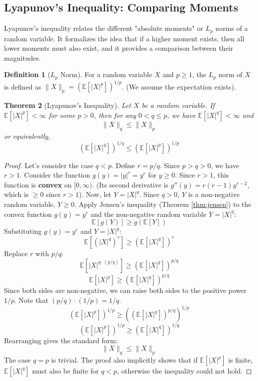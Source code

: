\documentclass[11pt, letterpaper]{article}
\theoremstyle{plain} %
\newtheorem{theorem}{Theorem}[section]
\theoremstyle{definition} %
\newtheorem{definition}[theorem]{Definition}
\theoremstyle{remark} %
\newcommand{\E}{\mathbb{E}} %
\begin{document}
\subsection{Lyapunov's Inequality: Comparing Moments}

Lyapunov's inequality relates the different "absolute moments" or $L_p$ norms of a random variable. It formalizes the idea that if a higher moment exists, then all lower moments must also exist, and it provides a comparison between their magnitudes.

\begin{definition}[$L_p$ Norm]
For a random variable $X$ and $p \ge 1$, the $L_p$ norm of $X$ is defined as $\|X\|_p = \left( \E[|X|^p] \right)^{1/p}$. (We assume the expectation exists).
\end{definition}

\begin{theorem}[Lyapunov's Inequality] \label{thm:lyapunov}
Let $X$ be a random variable. If $\E[|X|^p] < \infty$ for some $p > 0$, then for any $0 < q \le p$, we have $\E[|X|^q] < \infty$ and
\[
\|X\|_q \le \|X\|_p
\]
or equivalently,
\[
\left( \E[|X|^q] \right)^{1/q} \le \left( \E[|X|^p] \right)^{1/p}
\]
\end{theorem}

\begin{proof}
Let's consider the case $q < p$. Define $r = p/q$. Since $p > q > 0$, we have $r > 1$.
Consider the function $g(y) = |y|^r = y^r$ for $y \ge 0$. Since $r > 1$, this function is \textbf{convex} on $[0, \infty)$. (Its second derivative is $g''(y) = r(r-1)y^{r-2}$, which is $\ge 0$ since $r>1$).
Now, let $Y = |X|^q$. Since $q > 0$, $Y$ is a non-negative random variable, $Y \ge 0$.
Apply Jensen's inequality (Theorem \ref{thm:jensen}) to the convex function $g(y) = y^r$ and the non-negative random variable $Y = |X|^q$:
\[
\E[g(Y)] \ge g(\E[Y])
\]
Substituting $g(y) = y^r$ and $Y = |X|^q$:
\[
\E[(|X|^q)^r] \ge (\E[|X|^q])^r
\]
Replace $r$ with $p/q$:
\[
\E[|X|^{q \cdot (p/q)}] \ge (\E[|X|^q])^{p/q}
\]
\[
\E[|X|^p] \ge (\E[|X|^q])^{p/q}
\]
Since both sides are non-negative, we can raise both sides to the positive power $1/p$. Note that $(p/q) \cdot (1/p) = 1/q$.
\[
(\E[|X|^p])^{1/p} \ge \left( (\E[|X|^q])^{p/q} \right)^{1/p}
\]
\[
(\E[|X|^p])^{1/p} \ge (\E[|X|^q])^{1/q}
\]
Rearranging gives the standard form:
\[
\|X\|_q \le \|X\|_p
\]
The case $q=p$ is trivial. The proof also implicitly shows that if $\E[|X|^p]$ is finite, $\E[|X|^q]$ must also be finite for $q < p$, otherwise the inequality could not hold.
\end{proof}
\end{document}
